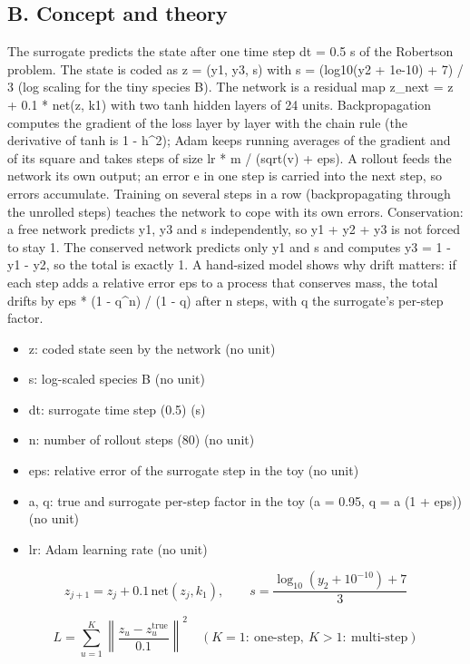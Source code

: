\documentclass[11pt,a4paper]{article}
\begin{document}
\subsection*{B. Concept and theory}
The surrogate predicts the state after one time step dt = 0.5 s of the Robertson problem. The state is coded as z = (y1, y3, s) with s = (log10(y2 + 1e-10) + 7) / 3 (log scaling for the tiny species B). The network is a residual map z\_next = z + 0.1 * net(z, k1) with two tanh hidden layers of 24 units. Backpropagation computes the gradient of the loss layer by layer with the chain rule (the derivative of tanh is 1 - h\textasciicircum{}2); Adam keeps running averages of the gradient and of its square and takes steps of size lr * m / (sqrt(v) + eps). A rollout feeds the network its own output; an error e in one step is carried into the next step, so errors accumulate. Training on several steps in a row (backpropagating through the unrolled steps) teaches the network to cope with its own errors. Conservation: a free network predicts y1, y3 and s independently, so y1 + y2 + y3 is not forced to stay 1. The conserved network predicts only y1 and s and computes y3 = 1 - y1 - y2, so the total is exactly 1. A hand-sized model shows why drift matters: if each step adds a relative error eps to a process that conserves mass, the total drifts by eps * (1 - q\textasciicircum{}n) / (1 - q) after n steps, with q the surrogate's per-step factor.

\begin{itemize}[nosep]
\item z: coded state seen by the network (no unit)
\item s: log-scaled species B (no unit)
\item dt: surrogate time step (0.5) (s)
\item n: number of rollout steps (80) (no unit)
\item eps: relative error of the surrogate step in the toy (no unit)
\item a, q: true and surrogate per-step factor in the toy (a = 0.95, q = a (1 + eps)) (no unit)
\item lr: Adam learning rate (no unit)
\end{itemize}

\begin{equation*}
z_{j+1}=z_j+0.1\,\mathrm{net}(z_j,k_1),\qquad s=\frac{\log_{10}(y_2+10^{-10})+7}{3}
\end{equation*}

\begin{equation*}
L=\sum_{u=1}^{K}\left\|\frac{z_u-z_u^{\mathrm{true}}}{0.1}\right\|^2\quad(K=1:\ \text{one-step},\ K>1:\ \text{multi-step})
\end{equation*}
\end{document}
